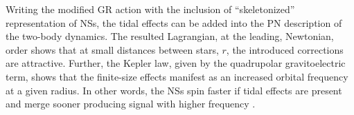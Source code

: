 Writing the modified \ac{GR} action with the inclusion of ``skeletonized'' representation
of \acp{NS}, the tidal effects can be added into the \ac{PN} description of the two-body dynamics.
The resulted Lagrangian, at the leading, Newtonian, order shows that at small distances 
between stars, $r$, the introduced corrections are attractive. 
%
Further, the Kepler law, given by the quadrupolar gravitoelectric term, 
%
%
shows that the finite-size effects manifest as an increased orbital frequency at a given radius.
In other words, the \acp{NS} spin faster if tidal effects are present and merge sooner 
producing signal with higher frequency \citep{Damour:2009wj}. 
%

